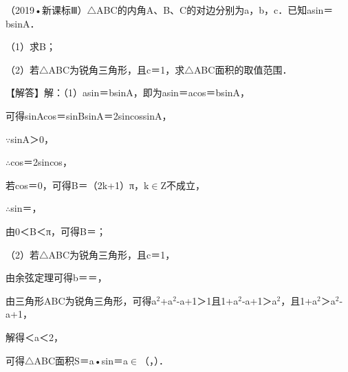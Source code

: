 \begin{question}
（2019•新课标Ⅲ）$\triangle$ABC的内角A、B、C的对边分别为a，b，c．已知asin\allowbreak{}＝bsinA．\par
（1）求B；\par
（2）若$\triangle$ABC为锐角三角形，且c＝1，求$\triangle$ABC面积的取值范围．\par
\begin{solution}
【解答】解：（1）asin\allowbreak{}＝bsinA，即为asin\allowbreak{}＝acos\allowbreak{}＝bsinA，\par
可得sinAcos\allowbreak{}＝sinBsinA＝2sin\allowbreak{}cos\allowbreak{}sinA，\par
$\because$sinA＞0，\par
$\therefore$cos\allowbreak{}＝2sin\allowbreak{}cos\allowbreak{}，\par
若cos\allowbreak{}＝0，可得B＝（2k+1）π，k$\in$Z不成立，\par
$\therefore$sin\allowbreak{}＝\allowbreak{}，\par
由0＜B＜π，可得B＝\allowbreak{}；\par
（2）若$\triangle$ABC为锐角三角形，且c＝1，\par
由余弦定理可得b＝\allowbreak{}＝\allowbreak{}，\par
由三角形ABC为锐角三角形，可得a$^{2}$+a$^{2}$-a+1＞1且1+a$^{2}$-a+1＞a$^{2}$，且1+a$^{2}$＞a$^{2}$-a+1，\par
解得\allowbreak{}＜a＜2，\par
可得$\triangle$ABC面积S＝\allowbreak{}a•sin\allowbreak{}＝\allowbreak{}a$\in$（\allowbreak{}，\allowbreak{}）．\par
\end{solution}
\end{question}

